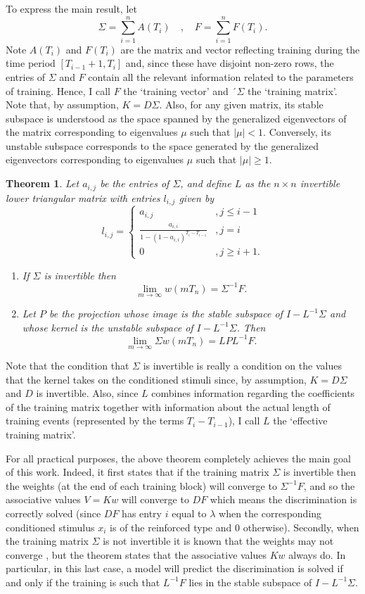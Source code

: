 \documentclass[]{interact}
\theoremstyle{plain}%
\newtheorem{theorem}{Theorem}
\theoremstyle{definition}
\theoremstyle{remark}
\newcommand{\quot}[1]{`#1'}
\begin{document}
To express the main result, let 
\[
\Sigma=\sum_{i=1}^nA(T_i) \quad , \quad F=\sum_{i=1}^nF(T_i).
\]
Note $A(T_i)$ and $F(T_i)$ are the matrix and vector reflecting training during the time period $[T_{i-1}+1,T_i]$ and, since these have disjoint non-zero rows, the entries of $\Sigma$ and $F$ contain all the relevant information related to the parameters of training. Hence, I call $F$ the \quot{training vector} and $´\Sigma$ the \quot{training matrix}. Note that, by assumption, $K=D\Sigma$.
Also, for any given matrix, its stable subspace is understood as the space spanned by the generalized eigenvectors of the matrix corresponding to eigenvalues $\mu$ such that $\left| \mu\right| < 1$. Conversely, its unstable subspace corresponds to the space generated by the generalized eigenvectors corresponding to eigenvalues $\mu$ such that $\left| \mu\right| \geq 1$.

\begin{theorem}\label{main_thm}
Let $a_{i,j}$ be the entries of $\Sigma$, and define $L$ as the $n\times n$ invertible lower triangular matrix with entries $l_{i,j}$ given by
\[
l_{i,j}=\begin{cases}
a_{i,j}& , j\leq i-1\\
\frac{a_{i,i}}{1-(1-a_{i,i})^{T_i-T_{i-1}}}& , j=i\\
0&, j\geq i+1.
\end{cases}
\]
\begin{enumerate}
\item If $\Sigma$ is invertible then
\[
\lim_{m\rightarrow\infty} w(mT_n)=\Sigma^{-1}F.
\]
\item Let $P$ be the projection whose image is the stable subspace of $I-L^{-1}\Sigma$ and whose kernel is the unstable subspace of $I-L^{-1}\Sigma$. Then
\[
\lim_{m\rightarrow\infty} \Sigma w(mT_n)=LPL^{-1}F.
\]
\end{enumerate}
\end{theorem}
Note that the condition that $\Sigma$ is invertible is really a condition on the values that the kernel takes on the conditioned stimuli since, by assumption, $K=D\Sigma$ and $D$ is invertible. Also, since $L$ combines information regarding the coefficients of the training matrix together with information about the actual length of training events (represented by the terms $T_i-T_{i-1}$), I call $L$ the \quot{effective training matrix}.

For all practical purposes, the above theorem completely achieves the main goal of this work. Indeed, it first states that if the training matrix $\Sigma$ is invertible then the weights (at the end of each training block) will converge to $\Sigma^{-1}F$, and so the associative values $V=Kw$ will converge to $DF$ which means the discrimination is correctly solved (since $DF$ has entry $i$ equal to $\lambda$ when the corresponding conditioned stimulus $x_i$ is of the reinforced type and $0$ otherwise). 
Secondly, when the training matrix $\Sigma$ is not invertible it is known that the weights may not converge \cite{A24}, but the theorem states that the associative values $Kw$ always do. In particular, in this last case, a model will predict the discrimination is solved if and only if the training is such that $L^{-1}F$ lies in the stable subspace of $I-L^{-1}\Sigma$.
\end{document}
